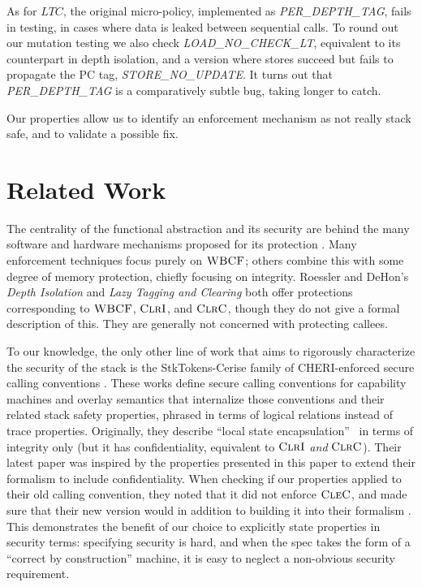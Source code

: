 \documentclass[10pt,conference]{ieeetran}%
\theoremstyle{definition}
\begin{document}
As for \(LTC\), the original micro-policy, implemented as {\em PER\_DEPTH\_TAG},
fails in testing, in cases where data is leaked between sequential calls.
To round out our mutation testing we also check {\em LOAD\_NO\_CHECK\_LT},
equivalent to its counterpart in depth isolation,
and a version where stores succeed but fails to propagate the PC tag, {\em STORE\_NO\_UPDATE}.
It turns out that {\em PER\_DEPTH\_TAG} is a comparatively subtle bug,
taking longer to catch.

Our properties allow us to identify an enforcement mechanism as
not really stack safe, and to validate a possible fix.

\section{Related Work}
\label{sec:relwork}

The centrality of the functional abstraction and its security are behind the
many software and hardware mechanisms proposed for its protection
\cite{Cowan+98, NagarakatteZMZ09, NagarakatteZMZ10, DeviettiBMZ08,
Kuznetsov+14, Dang+15, Shanbhogue+19, Woodruff+14, Chisnall+15,
SkorstengaardLocal, SkorstengaardSTKJFP, Georges22:TempsDesCerises,
DBLP:conf/sp/RoesslerD18, Gollapudi+23}.
%
Many enforcement techniques focus purely on \(\textnormal{\sc WBCF}\);
others combine this with some degree of memory protection,
chiefly focusing on integrity.
%
Roessler and DeHon's {\it Depth Isolation} and {\it Lazy Tagging and Clearing}
\cite{DBLP:conf/sp/RoesslerD18} both offer protections corresponding to
\(\textnormal{\sc WBCF}\), \(\textnormal{\sc ClrI}\), and \(\textnormal{\sc ClrC}\), though they do not give a formal description
of this. They are generally not concerned with protecting callees.

To our knowledge, the only other line of work that aims to rigorously characterize the
security of the stack is the StkTokens-Cerise family of CHERI-enforced secure calling
conventions \cite{SkorstengaardLocal, SkorstengaardSTKJFP, Georges22:TempsDesCerises}.
%
These works define secure calling conventions for capability machines and
overlay semantics that internalize those conventions and their related stack
safety properties, phrased in terms of logical relations instead of trace
properties.
%
Originally, they describe ``local state encapsulation''~\cite{SkorstengaardSTKJFP}
in terms of integrity only (but it has confidentiality, equivalent
to \(\textnormal{\sc ClrI}\) {\em and} \(\textnormal{\sc ClrC}\)). Their latest
paper \cite{Georges22:TempsDesCerises} was inspired by the properties presented
in this paper to extend their formalism to include confidentiality. When
checking if our properties applied to their old calling convention, they noted that
it did not enforce \(\textnormal{\sc CleC}\), and made sure that their new version
would in addition to building it into their formalism
\cite{Georges22:personalcommunication}. This demonstrates the benefit of our
choice to explicitly state properties in security terms: specifying security
is hard, and when the spec takes the form of a ``correct by
construction'' machine, it is easy to neglect a non-obvious security
requirement.
\end{document}
